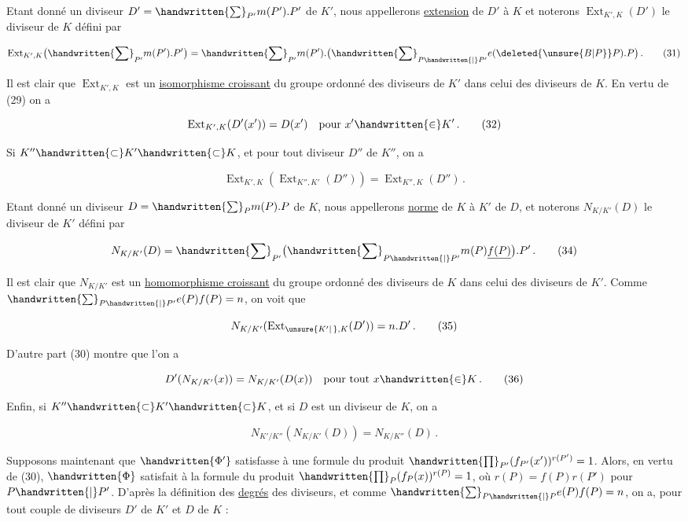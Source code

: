 
Etant donné un diviseur $D'=\handwritten{\sum}_{P'}m(P').P'$ de $K'$, nous appellerons \uline{extension} de $D'$ à $K$ et noterons $\operatorname{Ext}_{K',K}(D')$ le diviseur de $K$ défini par

\[ \operatorname{Ext}_{K',K}\bigl(\handwritten{\sum}_{P'}m(P').P'\bigr)=\handwritten{\sum}_{P'}m(P').\bigl(\handwritten{\sum}_{P\handwritten{\mid} P'}e(\deleted{\unsure{B|P}}P).P\bigr)\,.\tag*{(31)} \]

Il est clair que $\operatorname{Ext}_{K',K}$ est un \uline{isomorphisme croissant} du groupe  ordonné des diviseurs de $K'$ dans celui des diviseurs de $K$. En vertu de (29) on a

\[ \operatorname{Ext}_{K',K}(D'(x'))=D(x')\quad\text{pour }x'\handwritten{\in} K'\,.\tag*{(32)} \]

Si $K''\handwritten{\subset} K'\handwritten{\subset} K$, et pour tout diviseur $D''$ de $K''$, on a

\[ \operatorname{Ext}_{K',K}(\operatorname{Ext}_{K'',K'}(D''))=\operatorname{Ext}_{K'',K}(D'')\,.\tag*{(33)} \]

Etant donné un diviseur $D=\handwritten{\sum}_P m(P).P$ de $K$, nous appellerons \uline{norme} de $K$ à $K'$ de $D$, et noterons $N_{K/K'}(D)$ le diviseur de $K'$ défini par

\[ N_{K/K'}(D)=\handwritten{\sum}_{P'}\bigl(\handwritten{\sum}_{P\handwritten{\mid} P'}m(P)\underline{f(P)}\bigr).P'\,.\tag*{(34)} \]

Il est clair que $N_{K/K'}$ est un \uline{homomorphisme croissant} du groupe ordonné des diviseurs de $K$ dans celui des diviseurs de $K'$. Comme $\handwritten{\sum}_{P\handwritten{\mid} P'}e(P)f(P)=n$, on voit que

\[ N_{K/K'}(\operatorname{Ext}_{\unsure{K'|\,},K}(D'))=n.D'\,.\tag*{(35)} \]

D'autre part (30) montre que l'on a

\[ D'(N_{K/K'}(x))=N_{K/K'}(D(x))\quad\text{pour tout }x\handwritten{\in} K\,.\tag*{(36)} \]

Enfin, si $K''\handwritten{\subset} K'\handwritten{\subset} K$, et si $D$ est un diviseur de $K$, on a

\[ N_{K'/K''}(N_{K/K'}(D))=N_{K/K''}(D)\,.\tag*{(37)} \]

Supposons maintenant que $\handwritten{\Phi'}$ satisfasse à une formule du produit $\handwritten{\prod}_{P'}(f_{P'}(x'))^{r(P')}=1$. Alors, en vertu de (30), $\handwritten{\Phi}$ satisfait à la formule du produit $\handwritten{\prod}_P(f_P(x))^{r(P)}=1$, où $r(P)=f(P)r(P')$ pour $P\handwritten{\mid} P'$. D'après la définition des \uline{degrés} des diviseurs, et comme $\handwritten{\sum}_{P\handwritten{\mid} P}e(P)f(P)=n$, on a, pour tout couple de diviseurs $D'$ de $K'$ et $D$ de $K$ :

